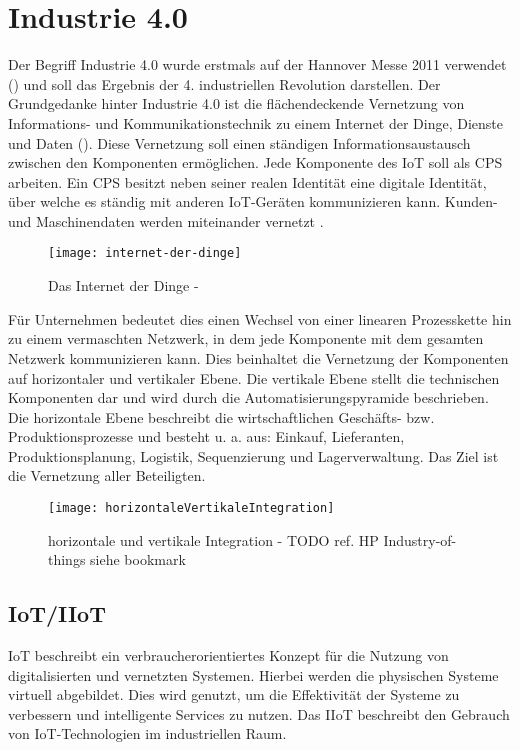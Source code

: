 \section{Industrie 4.0}
Der Begriff Industrie 4.0 wurde erstmals auf der Hannover Messe 2011 verwendet (\cite{drath2014}) und soll das Ergebnis der 4. industriellen Revolution darstellen. Der Grundgedanke hinter Industrie 4.0 ist die flächendeckende Vernetzung von Informations- und Kommunikationstechnik zu einem Internet der Dinge, Dienste und Daten (\cite{Spath2013}). Diese Vernetzung soll einen ständigen Informationsaustausch zwischen den Komponenten ermöglichen. Jede Komponente des \ac{IoT} soll als \ac{CPS} arbeiten. Ein \ac{CPS} besitzt neben seiner realen Identität eine digitale Identität, über welche es ständig mit anderen \ac{IoT}-Geräten kommunizieren kann. Kunden- und Maschinendaten werden miteinander vernetzt \cite{rami2016}.

\begin{figure}[h]
  \centering
  \texttt{[image: internet-der-dinge]}
  \caption{Das Internet der Dinge - \cite{rami2016}}
  \label{Kap2:Das Internet der Dinge}
\end{figure}

\clearpage

Für Unternehmen bedeutet dies einen Wechsel von einer linearen Prozesskette hin zu einem vermaschten Netzwerk, in dem jede Komponente mit dem gesamten Netzwerk kommunizieren kann. Dies beinhaltet die Vernetzung der Komponenten auf horizontaler und vertikaler Ebene. Die vertikale Ebene stellt die technischen Komponenten dar und wird durch die Automatisierungspyramide beschrieben. Die horizontale Ebene beschreibt die wirtschaftlichen Geschäfts- bzw. Produktionsprozesse und besteht u. a. aus: Einkauf, Lieferanten, Produktionsplanung, Logistik, Sequenzierung und Lagerverwaltung. Das Ziel ist die Vernetzung aller Beteiligten.

\begin{figure}[h]
  \centering
  \texttt{[image: horizontaleVertikaleIntegration]}
  \caption{horizontale und vertikale Integration - TODO ref. HP Industry-of-things siehe bookmark}
  \label{Kap2:horizontale und vertikale Integration}
\end{figure}

\clearpage

\subsection{\ac{IoT}/\ac{IIoT}}
\ac{IoT} beschreibt ein verbraucherorientiertes Konzept für die Nutzung von digitalisierten und vernetzten Systemen. Hierbei werden die physischen Systeme virtuell abgebildet. Dies wird genutzt, um die Effektivität der Systeme zu verbessern und intelligente Services zu nutzen. Das \ac{IIoT} beschreibt den Gebrauch von \ac{IoT}-Technologien im industriellen Raum.

